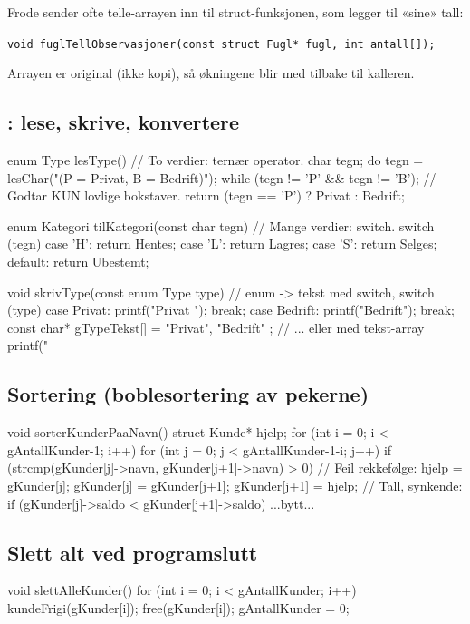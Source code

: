 \begin{tips}
Frode sender ofte telle-arrayen inn til struct-funksjonen, som legger til «sine» tall:\par
\lstinline|void fuglTellObservasjoner(const struct Fugl* fugl, int antall[]);|\par
Arrayen er original (ikke kopi), så økningene blir med tilbake til kalleren.
\end{tips}

\subsection{\texorpdfstring{}{enum}: lese, skrive, konvertere}\label{sec:enum}
\begin{kode}
enum Type lesType()  {                       //  To verdier: ternær operator.
  char tegn;
  do  {
    tegn = lesChar("\tType (P = Privat, B = Bedrift)");
  } while (tegn != 'P'  &&  tegn != 'B');    //  Godtar KUN lovlige bokstaver.
  return (tegn == 'P') ? Privat : Bedrift;
}

enum Kategori tilKategori(const char tegn)  {   //  Mange verdier: switch.
  switch (tegn)  {
    case 'H':  return Hentes;
    case 'L':  return Lagres;
    case 'S':  return Selges;
    default:   return Ubestemt;
  }
}

void skrivType(const enum Type type)  {      //  enum -> tekst med switch,
  switch (type)  {
    case Privat:   printf("Privat ");   break;
    case Bedrift:  printf("Bedrift");   break;
  }
}
const char* gTypeTekst[] = { "Privat", "Bedrift" };   //  ... eller med tekst-array
printf("%
\end{kode}

\subsection{Sortering (boblesortering av pekerne)}\label{sec:sortering}
\begin{kode}
void sorterKunderPaaNavn()  {
  struct Kunde* hjelp;
  for (int i = 0;  i < gAntallKunder-1;  i++)
      for (int j = 0;  j < gAntallKunder-1-i;  j++)
          if (strcmp(gKunder[j]->navn, gKunder[j+1]->navn) > 0)  {  //  Feil rekkefølge:
             hjelp = gKunder[j];   gKunder[j] = gKunder[j+1];   gKunder[j+1] = hjelp;
          }
}
//  Tall, synkende:   if (gKunder[j]->saldo < gKunder[j+1]->saldo)  { ...bytt... }
\end{kode}

\subsection{Slett alt ved programslutt}
\begin{kode}
void slettAlleKunder()  {
  for (int i = 0;  i < gAntallKunder;  i++)  {
      kundeFrigi(gKunder[i]);   free(gKunder[i]);
  }
  gAntallKunder = 0;
}
\end{kode}

